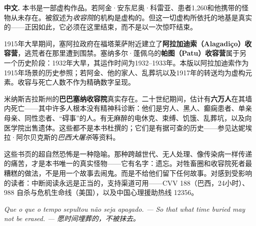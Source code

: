 \noindent\textbf{中文.} 本书是一部虚构作品。若阿金·安东尼奥·科雷亚、患者1,260和他携带的怪物从未存在。被叙述为\textit{收容院}的机构是虚构的。但这一切虚构所依托的地基是真实的——正因如此，它必须在这里结束，而不是以一次惊吓结束。

\vspace{0.6em}
\noindent 1915年大旱期间，塞阿拉政府在福塔莱萨附近建立了\textbf{阿拉加迪索（Alagadiço）收容营}，逃荒者在那里遭到围禁。塞纳多尔·蓬佩乌的\textbf{帕图（Patu）收容营}属于另一个历史阶段：1932年大旱，其运作时间为1932--1933年。本版以阿拉加迪索作为1915年场景的历史参照；若阿金、他的家人、乱葬坑以及1917年的转送均为虚构元素。收容与死亡人数不作为精确数字呈现。

\vspace{0.6em}
\noindent 米纳斯吉拉斯州的\textbf{巴巴塞纳收容院}真实存在。二十世纪期间，估计有\textbf{六万人}在其墙内死亡——其中许多人根本没有精神科诊断：他们是穷人、黑人、癫痫患者、单亲母亲、同性恋者、“碍事”的人。有无麻醉的电休克、束缚、饥饿、乱葬坑，以及向医学院出售遗体。这些都不是本书杜撰的；它们是有据可查的历史——参见达妮埃拉·阿尔贝克斯的\textit{巴西大屠杀}等资料。

\vspace{0.6em}
\noindent 这些书页的超自然恐怖是一种隐喻。那种跨越世代、无人处理、像传染病一样传递的痛苦，才是本书唯一的真实怪物——它有名字：遗忘。对牲畜圈和收容院死者最糟糕的做法，不是用一个故事去闹鬼。而是不给他们留下任何故事。对感到受影响的读者：中断阅读永远是正当的，支持渠道可用——CVV 188（巴西，24小时）、988 自杀与危机生命线（美国），以及中国心理援助热线 12356。

\vspace{1.2em}

\noindent\hfill\textit{Que o que o tempo sepultou não seja apagado. --- So that what time buried may not be erased. --- 愿时间埋葬的，不被抹去。}\hspace{2em}
